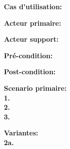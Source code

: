 \textbf{Cas d'utilisation:}

\textbf{Acteur primaire:}

\textbf{Acteur support:}

\textbf{Pré-condition: } 
 
\textbf{Post-condition: } 

\textbf{Scenario primaire: } \\
    \textbf{1.} \\
    \textbf{2.} \\
    \textbf{3.}

\textbf{Variantes:}\\
    \textbf{2a.} 